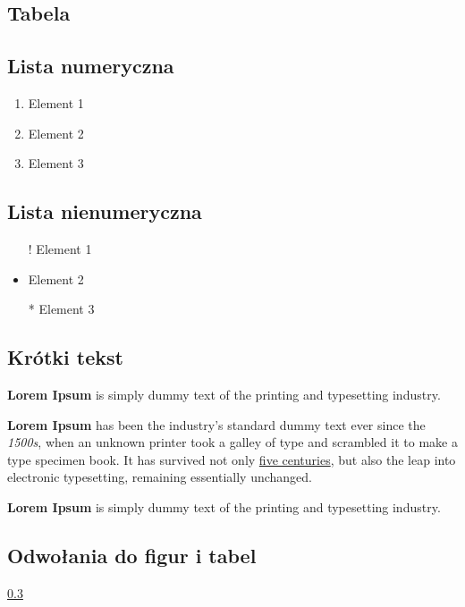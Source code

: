 \subsection{Tabela}
    

\subsection{Lista numeryczna}
\begin{enumerate}
    \item Element 1
    \item Element 2
    \item Element 3
\end{enumerate}


\subsection{Lista nienumeryczna}\label{marker}
\begin{itemize}
    \item[!] Element 1
    \item Element 2
    \item[*] Element 3
\end{itemize}

\subsection{Krótki tekst} 
\textbf{Lorem Ipsum} is simply dummy text of the printing and typesetting industry.  \par
\textbf{Lorem Ipsum} has been the industry's standard dummy text ever since the \emph{1500s}, when an unknown printer took a galley of type and scrambled it to make a type specimen book. It has survived not only \underline{five centuries}, but also the leap into electronic typesetting, remaining essentially unchanged. \par
\textbf{Lorem Ipsum} is simply dummy text of the printing and typesetting industry.

\subsection{Odwołania do figur i tabel}
\pageref{marker}
\ref{marker}

